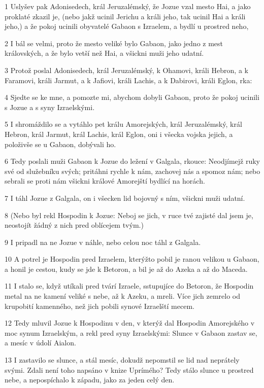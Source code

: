 \par 1 Uslyšev pak Adonisedech, král Jeruzalémský, že Jozue vzal mesto Hai, a jako proklaté zkazil je, (nebo jakž ucinil Jerichu a králi jeho, tak ucinil Hai a králi jeho,) a že pokoj ucinili obyvatelé Gabaon s Izraelem, a bydlí u prostred neho,
\par 2 I bál se velmi, proto že mesto veliké bylo Gabaon, jako jedno z mest královských, a že bylo vetší než Hai, a všickni muži jeho udatní.
\par 3 Protož poslal Adonisedech, král Jeruzalémský, k Ohamovi, králi Hebron, a k Faramovi, králi Jarmut, a k Jafiovi, králi Lachis, a k Dabirovi, králi Eglon, rka:
\par 4 Sjedte se ke mne, a pomozte mi, abychom dobyli Gabaon, proto že pokoj ucinili s Jozue a s syny Izraelskými.
\par 5 I shromáždilo se a vytáhlo pet králu Amorejských, král Jeruzalémský, král Hebron, král Jarmut, král Lachis, král Eglon, oni i všecka vojska jejich, a položivše se u Gabaon, dobývali ho.
\par 6 Tedy poslali muži Gabaon k Jozue do ležení v Galgala, rkouce: Neodjímejž ruky své od služebníku svých; pritáhni rychle k nám, zachovej nás a spomoz nám; nebo sebrali se proti nám všickni králové Amorejští bydlící na horách.
\par 7 I táhl Jozue z Galgala, on i všecken lid bojovný s ním, všickni muži udatní.
\par 8 (Nebo byl rekl Hospodin k Jozue: Neboj se jich, v ruce tvé zajisté dal jsem je, neostojít žádný z nich pred oblícejem tvým.)
\par 9 I pripadl na ne Jozue v náhle, nebo celou noc táhl z Galgala.
\par 10 A potrel je Hospodin pred Izraelem, kterýžto pobil je ranou velikou u Gabaon, a honil je cestou, kudy se jde k Betoron, a bil je až do Azeka a až do Maceda.
\par 11 I stalo se, když utíkali pred tvárí Izraele, sstupujíce do Betoron, že Hospodin metal na ne kamení veliké s nebe, až k Azeku, a mreli. Více jich zemrelo od krupobití kamenného, než jich pobili synové Izraelští mecem.
\par 12 Tedy mluvil Jozue k Hospodinu v den, v kterýž dal Hospodin Amorejského v moc synum Izraelským, a rekl pred syny Izraelskými: Slunce v Gabaon zastav se, a mesíc v údolí Aialon.
\par 13 I zastavilo se slunce, a stál mesíc, dokudž nepomstil se lid nad neprátely svými. Zdali není toho napsáno v knize Uprímého? Tedy stálo slunce u prostred nebe, a nepospíchalo k západu, jako za jeden celý den.
